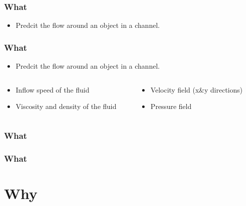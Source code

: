 \documentclass[18pt]{beamer}
\begin{document}
\begin{frame}
  \frametitle{What}
  \begin{itemize}
  \item Predcit the flow around an object in a channel.
  \end{itemize}
\end{frame}

\begin{frame}
  \frametitle{What}
  \begin{itemize}
  \item Predcit the flow around an object in a channel.
  \end{itemize}


    \begin{columns}[t]
    \begin{column}{0.5\textwidth}

      \begin{itemize}
      \item Inflow speed of the fluid
      \item Viscosity and density of the fluid
      \end{itemize}
      
    \end{column}
    \begin{column}{0.5\textwidth}

      \begin{itemize}
      \item Velocity field (x\&y directions)
      \item Pressure field
      \end{itemize}
      
    \end{column}
  \end{columns}

\end{frame}

\begin{frame}
  \frametitle{What}
\end{frame}

\begin{frame}
  \frametitle{What}
\end{frame}

\section{Why}
\end{document}
